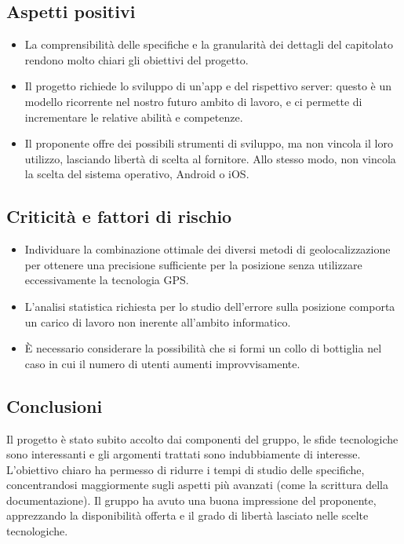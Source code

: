 \documentclass[../studio-di-fattibilita.tex]{subfiles}
\begin{document}
	\subsection{Aspetti positivi}
	\label{subsec:aspetti_positivi}
	\begin{itemize}
		\item La comprensibilità delle specifiche e la granularità dei dettagli del capitolato rendono molto chiari gli obiettivi del progetto.
		\item Il progetto richiede lo sviluppo di un'app e del rispettivo server: questo è un modello ricorrente nel nostro futuro ambito di lavoro, e ci permette di incrementare le relative abilità e competenze.
		\item Il proponente offre dei possibili strumenti di sviluppo, ma non vincola il loro utilizzo, lasciando libertà di scelta al fornitore. Allo stesso modo, non vincola la scelta del sistema operativo, Android o iOS.
	\end{itemize}
	\subsection{Criticità e fattori di rischio}
	\label{subsec:criticità_e_fattori_di_rischio}
	\begin{itemize}
		\item Individuare la combinazione ottimale dei diversi metodi di geolocalizzazione per ottenere una precisione sufficiente per la posizione senza utilizzare eccessivamente la tecnologia GPS.
		\item L'analisi statistica richiesta per lo studio dell'errore sulla posizione comporta un carico di lavoro non inerente all'ambito informatico.
		\item È necessario considerare la possibilità che si formi un collo di bottiglia nel caso in cui il numero di utenti aumenti improvvisamente.
	\end{itemize}
	\subsection{Conclusioni}
	\label{subsec:conclusioni}
	Il progetto è stato subito accolto dai componenti del gruppo, le sfide tecnologiche sono interessanti e gli argomenti trattati sono indubbiamente di interesse. L'obiettivo chiaro ha permesso di ridurre i tempi di studio delle specifiche, concentrandosi maggiormente sugli aspetti più avanzati (come la scrittura della documentazione). Il gruppo ha avuto una buona impressione del proponente, apprezzando la disponibilità offerta e il grado di libertà lasciato nelle scelte tecnologiche. 
\end{document}
